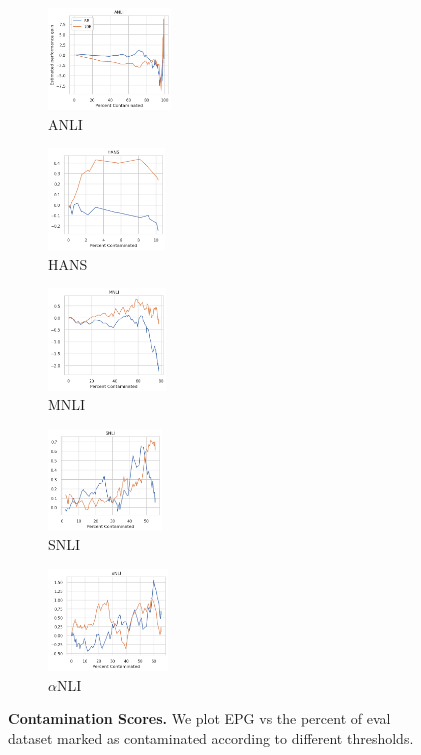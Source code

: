 \begin{figure}[t]
    \begin{subfigure}[b]{0.20\textwidth}
    \centering
    \includegraphics[height=2.7cm]{figures/contamination_anli}
    \caption{ANLI}
    \end{subfigure}
    \label{fig:cont_anli}
    \begin{subfigure}[b]{0.19\textwidth}
    \centering
    \includegraphics[height=2.7cm]{figures/contamination_hansnli}
    \caption{HANS}
    \label{fig:cont_hans}
    \end{subfigure}
    \begin{subfigure}[b]{0.19\textwidth}
    \centering
    \includegraphics[height=2.7cm]{figures/contamination_mnli_matched}
    \caption{MNLI}
    \label{fig:cont_mnli}
    \end{subfigure}
    \begin{subfigure}[b]{0.19\textwidth}
    \centering
    \includegraphics[height=2.7cm]{figures/contamination_snli}
    \caption{SNLI}
    \label{fig:cont_snli}
    \end{subfigure}
    \begin{subfigure}[b]{0.19\textwidth}
    \centering
    \includegraphics[height=2.7cm]{figures/contamination_abductivenli}
    \caption{$\alpha$NLI}
    \label{fig:cont_alphanli}
    \end{subfigure}
    \caption{\textbf{Contamination Scores.} We plot EPG vs the percent of eval dataset marked as contaminated according to different thresholds.}\label{fig:contamination}
\end{figure}


